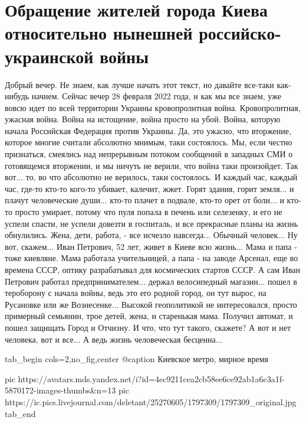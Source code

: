  
 
 
 
 

\section{Обращение жителей города Киева относительно нынешней российско-украинской войны}

Добрый вечер. Не знаем, как лучше начать этот текст, но давайте все-таки
как-нибудь начнем. Сейчас вечер 28 февраля 2022 года, и как мы все знаем, уже
вовсю идет по всей территории Украины кровопролитная война. Кровопролитная,
ужасная война. Война на истощение, война просто на убой. Война, которую начала
Российская Федерация против Украины. Да, это ужасно, что вторжение, которое
многие считали абсолютно мнимым, таки состоялось. Мы, если честно признаться,
смеялись над непрерывным потоком сообщений в западных СМИ о готовящемся
вторжении, и мы ничуть не верили, что война таки произойдет. Так вот... то, во
что абсолютно не верилось, таки состоялось. И каждый час, каждый час, где-то
кто-то кого-то убивает, калечит, жжет. Горят здания, горит земля... и плачут
человеческие души...  кто-то плачет в подвале, кто-то орет от боли... и кто-то
просто умирает, потому что пуля попала в печень или селезенку, и его не успели
спасти, не успели довезти в госпиталь, и все прекрасные планы на жизнь
обнулились. Жена, дети, работа, - все исчезло навсегда... Обычный человек... Ну
вот, скажем...  Иван Петрович, 52 лет, живет в Киеве всю жизнь... Мама и папа -
тоже киевляне.  Мама работала учительницей, а папа - на заводе Арсенал, еще во
времена СССР, оптику разрабатывал для космических стартов СССР.  А сам Иван
Петрович работал предпринимателем... держал велосипедный магазин... пошел в
тероборону с начала войны, ведь это его родной город, он тут вырос, на
Русановке или же Вознесенке... Высокой геополитикой не интересовался, просто
примерный семьянин, трое детей, жена, и старенькая мама.  Получил автомат, и
пошел защищать Город и Отчизну. И что, что тут такого, скажете? А вот и нет
человека, вот и все...  А ведь жизнь человеческая бесценна...

\ifcmt
  tab_begin cols=2,no_fig,center
		 @caption Киевское метро, мирное время

     pic https://avatars.mds.yandex.net/i?id=4ec9211cea2cb58ee6ce92ab1a6c3a1f-5870172-images-thumbs&n=13
		 pic https://ic.pics.livejournal.com/deletant/25270605/1797309/1797309_original.jpg
  tab_end
\fi

